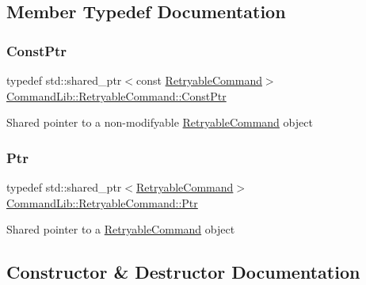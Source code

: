 \subsection{Member Typedef Documentation}
\mbox{\label{class_command_lib_1_1_retryable_command_a8fadc39a8e4e18ddf7f468299dc55098}} 
\subsubsection{\texorpdfstring{Const\+Ptr}{ConstPtr}}
{\footnotesize\ttfamily typedef std\+::shared\+\_\+ptr$<$const \mbox{\hyperlink{class_command_lib_1_1_retryable_command}{Retryable\+Command}}$>$ \mbox{\hyperlink{class_command_lib_1_1_retryable_command_a8fadc39a8e4e18ddf7f468299dc55098}{Command\+Lib\+::\+Retryable\+Command\+::\+Const\+Ptr}}}



Shared pointer to a non-\/modifyable \mbox{\hyperlink{class_command_lib_1_1_retryable_command}{Retryable\+Command}} object

\mbox{\label{class_command_lib_1_1_retryable_command_a5bb8960c450efd6e72f93a2409c73d4c}} 
\subsubsection{\texorpdfstring{Ptr}{Ptr}}
{\footnotesize\ttfamily typedef std\+::shared\+\_\+ptr$<$\mbox{\hyperlink{class_command_lib_1_1_retryable_command}{Retryable\+Command}}$>$ \mbox{\hyperlink{class_command_lib_1_1_retryable_command_a5bb8960c450efd6e72f93a2409c73d4c}{Command\+Lib\+::\+Retryable\+Command\+::\+Ptr}}}



Shared pointer to a \mbox{\hyperlink{class_command_lib_1_1_retryable_command}{Retryable\+Command}} object



\subsection{Constructor \& Destructor Documentation}
\mbox{\label{class_command_lib_1_1_retryable_command_a0fc3a84697043a689c83106f9f9c6a4a}} 
